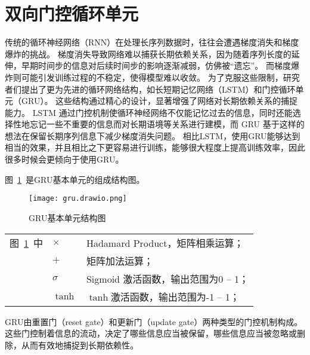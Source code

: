 \section{双向门控循环单元}
传统的循环神经网络（RNN）在处理长序列数据时，往往会遭遇梯度消失和梯度爆炸的挑战。
梯度消失导致网络难以捕获长期依赖关系，因为随着序列长度的延伸，早期时间步的信息对后续时间步的影响逐渐减弱，仿佛被“遗忘”。
而梯度爆炸则可能引发训练过程的不稳定，使得模型难以收敛。
为了克服这些限制，研究者们提出了更为先进的循环网络结构，如长短期记忆网络（LSTM）\cite{memory2010long}和门控循环单元（GRU）\cite{cho2014learning}。
这些结构通过精心的设计，显著增强了网络对长期依赖关系的捕捉能力。
LSTM 通过门控机制使循环神经网络不仅能记忆过去的信息，同时还能选择性地忘记一些不重要的信息而对长期语境等关系进行建模，而 GRU 基于这样的想法在保留长期序列信息下减少梯度消失问题。
相比LSTM，使用GRU能够达到相当的效果，并且相比之下更容易进行训练，能够很大程度上提高训练效率，因此很多时候会更倾向于使用GRU。

图~\ref{fig:GRUunit}~是GRU基本单元的组成结构图。
\begin{figure}[h] 
  \centering
  \texttt{[image: gru.drawio.png]}
  \caption{GRU基本单元结构图}
  \label{fig:GRUunit}
\end{figure}
\begin{flushleft}
  \renewcommand\arraystretch{1.25}
  \begin{tabularx}{\textwidth}{@{}>{\normalsize\rm}l@{\quad}>{\normalsize\rm}l@{——}>{\normalsize\rm}X@{}}
  图~\ref{fig:GRUunit}~中
  &  $\times$ &Hadamard Product，矩阵相乘运算；\\
  &  $+$ &矩阵加法运算；\\
  &  $σ$ &Sigmoid 激活函数，输出范围为0 -- 1；\\
  &  $\tanh$ & $\tanh$激活函数，输出范围为-1 -- 1；\\
  \end{tabularx}\vspace{.5ex}%
\end{flushleft}

GRU由重置门（reset gate）和更新门（update gate）两种类型的门控机制构成。
这些门控制着信息的流动，决定了哪些信息应当被保留，哪些信息应当被忽略或删除，从而有效地捕捉到长期依赖性。

